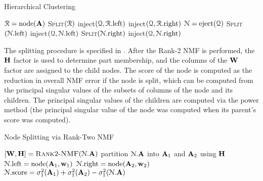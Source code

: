 \documentclass[conference,compsoc]{IEEEtran}
\begin{document}
\begin{algorithm}
\caption{Hierarchical Clustering \cite{KP13}}
\label{alg:hiernmf2}
\begin{algorithmic}[1]
		\State ${\cal R} = \text{node}(\M{A})$ \hfill {}
		\State \textsc{Split}$({\cal R})$
		\State inject$({\cal Q},{\cal R}.\text{left})$ \hfill {}
		\State inject$({\cal Q},{\cal R}.\text{right})$ \hfill {}
			\State ${\cal N} = \text{eject}({\cal Q})$ \hfill {}
			\State \textsc{Split}$({\cal N}.\text{left})$ \hfill {}
			\State inject$({\cal Q},{\cal N}.\text{left})$ \hfill {}
			\State \textsc{Split}$({\cal N}.\text{right})$ \hfill {}
			\State inject$({\cal Q},{\cal N}.\text{right})$ \hfill {}
		\EndWhile
	\EndFunction
\end{algorithmic}
\end{algorithm}

The splitting procedure is specified in .
After the Rank-2 NMF is performed, the $\M{H}$ factor is used to determine part membership, and the columns of the $\M{W}$ factor are assigned to the child nodes.
The score of the node is computed as the reduction in overall NMF error if the node is split, which can be computed from the principal singular values of the subsets of columns of the node and its children.
The principal singular values of the children are computed via the power method (the principal singular value of the node was computed when its parent's score was computed).

\begin{algorithm}
\caption{Node Splitting via Rank-Two NMF}
\label{alg:split}
\begin{algorithmic}[1]
		\State $[\M{W},\M{H}] = \textsc{Rank2-NMF}({\cal N}.\M{A})$ \hfill {}
		\State partition ${\cal N}.\M{A}$ into $\M{A}_1$ and $\M{A}_2$ using $\M{H}$
		\State ${\cal N}.\text{left} = \text{node}(\M{A}_1,\V{W}_1)$ \hfill {}
		\State ${\cal N}.\text{right} = \text{node}(\M{A}_2,\V{W}_2)$ \hfill {}
		\State ${\cal N}.\text{score} = \sigma_1^2(\M{A}_1) + \sigma_1^2(\M{A}_2) - \sigma_1^2({\cal N}.\M{A})$
	\EndFunction
\end{algorithmic}
\end{algorithm}
\end{document}
